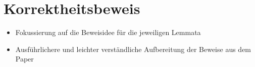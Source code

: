 \section{Korrektheitsbeweis}

\begin{itemize}
	\item Fokussierung auf die Beweisidee für die jeweiligen Lemmata
	\item Ausführlichere und leichter verständliche Aufbereitung der Beweise aus dem Paper
\end{itemize}